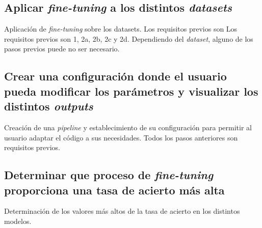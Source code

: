 \subsection{Aplicar \textit{fine-tuning} a los distintos \textit{datasets}}

Aplicación de \textit{fine-tuning} sobre los datasets. Los requisitos previos son  Los requisitos previos son 1, 2a, 2b, 2c y 2d. Dependiendo del \textit{dataset}, alguno de los pasos previos puede no ser necesario.

\subsection{Crear una configuración donde el usuario pueda modificar los parámetros y visualizar los distintos \textit{outputs}}

Creación de una \textit{pipeline} y establecimiento de su configuración para permitir al usuario adaptar el código a sus necesidades. Todos los pasos anteriores son requisitos previos.

\subsection{Determinar que proceso de \textit{fine-tuning} proporciona una tasa de acierto más alta}

Determinación de los valores más altos de la tasa de acierto en los distintos modelos.




